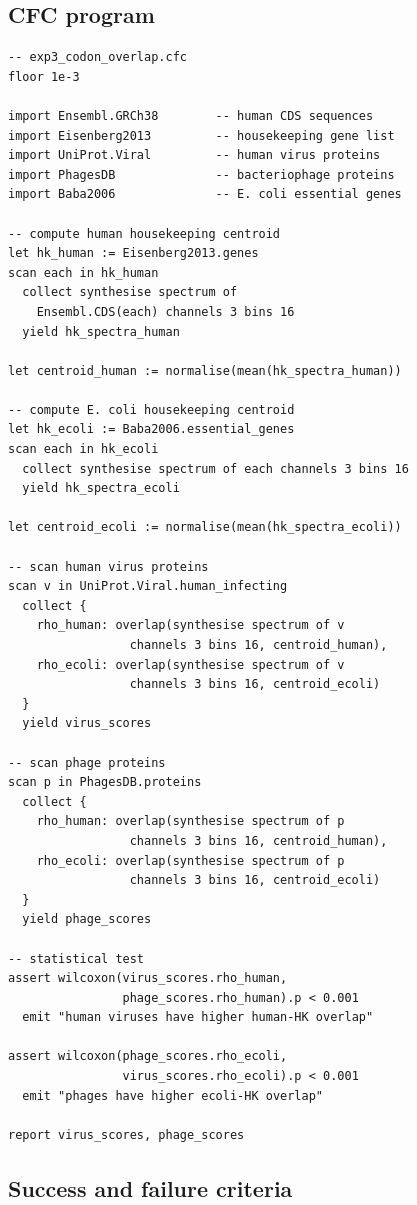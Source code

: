 \documentclass[11pt,a4paper]{article}
\theoremstyle{expthm}
\theoremstyle{definition}
\theoremstyle{remark}
\begin{document}
\subsection{CFC program}

\begin{lstlisting}[caption={E3: spectral codon-usage overlap.}]
-- exp3_codon_overlap.cfc
floor 1e-3

import Ensembl.GRCh38        -- human CDS sequences
import Eisenberg2013         -- housekeeping gene list
import UniProt.Viral         -- human virus proteins
import PhagesDB              -- bacteriophage proteins
import Baba2006              -- E. coli essential genes

-- compute human housekeeping centroid
let hk_human := Eisenberg2013.genes
scan each in hk_human
  collect synthesise spectrum of
    Ensembl.CDS(each) channels 3 bins 16
  yield hk_spectra_human

let centroid_human := normalise(mean(hk_spectra_human))

-- compute E. coli housekeeping centroid
let hk_ecoli := Baba2006.essential_genes
scan each in hk_ecoli
  collect synthesise spectrum of each channels 3 bins 16
  yield hk_spectra_ecoli

let centroid_ecoli := normalise(mean(hk_spectra_ecoli))

-- scan human virus proteins
scan v in UniProt.Viral.human_infecting
  collect {
    rho_human: overlap(synthesise spectrum of v
                 channels 3 bins 16, centroid_human),
    rho_ecoli: overlap(synthesise spectrum of v
                 channels 3 bins 16, centroid_ecoli)
  }
  yield virus_scores

-- scan phage proteins
scan p in PhagesDB.proteins
  collect {
    rho_human: overlap(synthesise spectrum of p
                 channels 3 bins 16, centroid_human),
    rho_ecoli: overlap(synthesise spectrum of p
                 channels 3 bins 16, centroid_ecoli)
  }
  yield phage_scores

-- statistical test
assert wilcoxon(virus_scores.rho_human,
                phage_scores.rho_human).p < 0.001
  emit "human viruses have higher human-HK overlap"

assert wilcoxon(phage_scores.rho_ecoli,
                virus_scores.rho_ecoli).p < 0.001
  emit "phages have higher ecoli-HK overlap"

report virus_scores, phage_scores
\end{lstlisting}

\subsection{Success and failure criteria}
\end{document}
